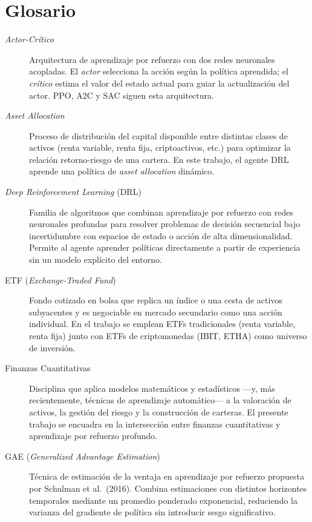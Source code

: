 \documentclass[IB,a4paper]{TFUOC}
\begin{document}
\chapter{Glosario}

\begin{description}

    \item[\textit{Actor-Crítico}] Arquitectura de aprendizaje por refuerzo con dos redes neuronales acopladas. El \textit{actor} selecciona la acción según la política aprendida; el \textit{crítico} estima el valor del estado actual para guiar la actualización del actor. PPO, A2C y SAC siguen esta arquitectura.

    \item[\textit{Asset Allocation}] Proceso de distribución del capital disponible entre distintas clases de activos (renta variable, renta fija, criptoactivos, etc.) para optimizar la relación retorno-riesgo de una cartera. En este trabajo, el agente DRL aprende una política de \textit{asset allocation} dinámico.

    \item[\textit{Deep Reinforcement Learning} (DRL)] Familia de algoritmos que combinan aprendizaje por refuerzo con redes neuronales profundas para resolver problemas de decisión secuencial bajo incertidumbre con espacios de estado o acción de alta dimensionalidad. Permite al agente aprender políticas directamente a partir de experiencia sin un modelo explícito del entorno.

    \item[ETF (\textit{Exchange-Traded Fund})] Fondo cotizado en bolsa que replica un índice o una cesta de activos subyacentes y es negociable en mercado secundario como una acción individual. En el trabajo se emplean ETFs tradicionales (renta variable, renta fija) junto con ETFs de criptomonedas (IBIT, ETHA) como universo de inversión.

    \item[Finanzas Cuantitativas] Disciplina que aplica modelos matemáticos y estadísticos —y, más recientemente, técnicas de aprendizaje automático— a la valoración de activos, la gestión del riesgo y la construcción de carteras. El presente trabajo se encuadra en la intersección entre finanzas cuantitativas y aprendizaje por refuerzo profundo.

    \item[GAE (\textit{Generalized Advantage Estimation})] Técnica de estimación de la ventaja en aprendizaje por refuerzo propuesta por Schulman et al.\ (2016). Combina estimaciones con distintos horizontes temporales mediante un promedio ponderado exponencial, reduciendo la varianza del gradiente de política sin introducir sesgo significativo.


\end{description}
\end{document}
